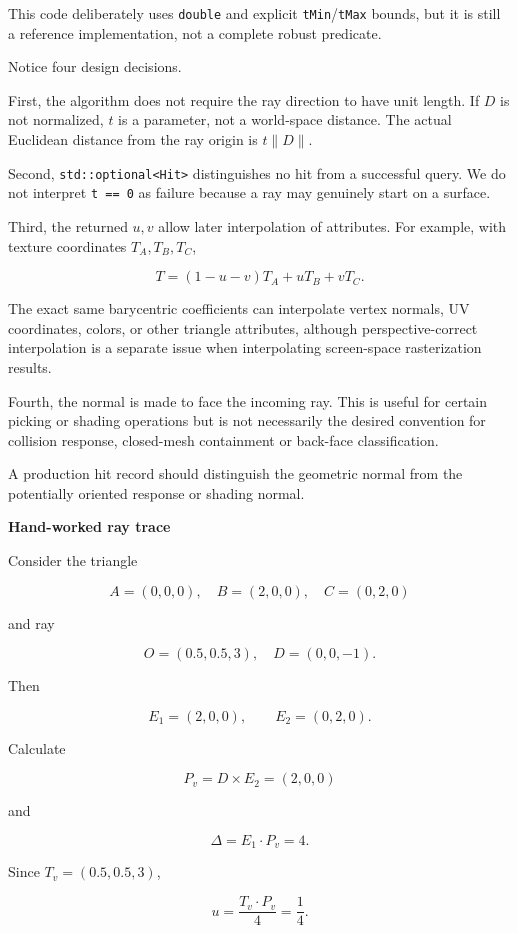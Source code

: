 This code deliberately uses \texttt{double} and explicit \texttt{tMin}/\texttt{tMax} bounds, but it is still a reference implementation, not a complete robust predicate.

Notice four design decisions.

First, the algorithm does not require the ray direction to have unit length. If \(D\) is not normalized, \(t\) is a parameter, not a world-space distance. The actual Euclidean distance from the ray origin is \(t\|D\|\).

Second, \texttt{std::optional\textless{}Hit\textgreater{}} distinguishes no hit from a successful query. We do not interpret \texttt{t\ ==\ 0} as failure because a ray may genuinely start on a surface.

Third, the returned \(u,v\) allow later interpolation of attributes. For example, with texture coordinates \(T_A,T_B,T_C\),

\[
T=(1-u-v)T_A+uT_B+vT_C.
\]

The exact same barycentric coefficients can interpolate vertex normals, UV coordinates, colors, or other triangle attributes, although perspective-correct interpolation is a separate issue when interpolating screen-space rasterization results.

Fourth, the normal is made to face the incoming ray. This is useful for certain picking or shading operations but is not necessarily the desired convention for collision response, closed-mesh containment or back-face classification.

A production hit record should distinguish the geometric normal from the potentially oriented response or shading normal.

\textbf{Hand-worked ray trace}

Consider the triangle

\[
A=(0,0,0),\quad B=(2,0,0),\quad C=(0,2,0)
\]

and ray

\[
O=(0.5,0.5,3),\quad D=(0,0,-1).
\]

Then

\[
E_1=(2,0,0),\qquad E_2=(0,2,0).
\]

Calculate

\[
P_v=D\times E_2=(2,0,0)
\]

and

\[
\Delta=E_1\cdot P_v=4.
\]

Since \(T_v=(0.5,0.5,3)\),

\[
u=\frac{T_v\cdot P_v}{4}=\frac14.
\]

